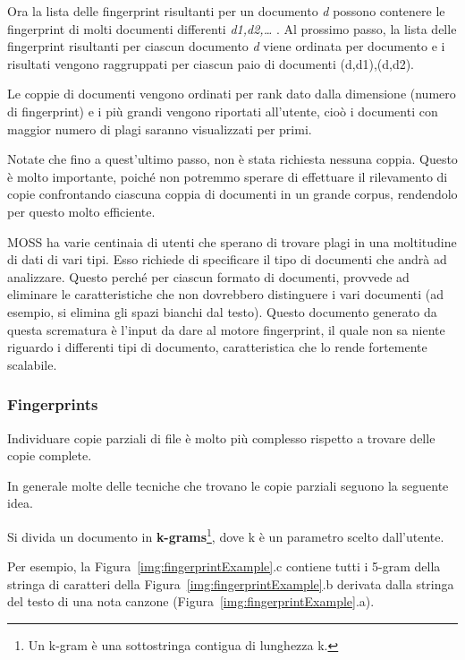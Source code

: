 			Ora la lista delle fingerprint risultanti per un documento \textit{d} possono contenere le fingerprint di molti documenti differenti \textit{ d1,d2,… }.
			Al prossimo passo, la lista delle fingerprint risultanti per ciascun documento \textit{d} viene ordinata per documento e i risultati vengono raggruppati per ciascun paio di documenti (d,d1),(d,d2). 
			
			Le coppie di documenti vengono ordinati per rank dato dalla dimensione (numero di fingerprint) e i più grandi vengono riportati all'utente, cioò i documenti con maggior numero di plagi saranno visualizzati per primi. 
			
			Notate che fino a quest'ultimo passo, non è stata richiesta nessuna coppia. 
			Questo è molto importante, poiché non potremmo sperare di effettuare il rilevamento di copie confrontando ciascuna coppia di documenti in un grande corpus, rendendolo per questo molto efficiente.
	
			MOSS ha varie centinaia di utenti che sperano di trovare plagi in una moltitudine di dati di vari tipi. Esso richiede di specificare il tipo di documenti che andrà ad analizzare. Questo perché per ciascun formato di documenti, provvede ad eliminare le caratteristiche che non dovrebbero distinguere i vari documenti (ad esempio, si elimina gli spazi bianchi dal testo). 
			Questo documento generato da questa scrematura è l'input da dare al motore fingerprint, il quale non sa niente riguardo i differenti tipi di documento, caratteristica che lo rende fortemente scalabile.
			
			\subsubsection{Fingerprints}\label{def:Fingerprint}
				Individuare copie parziali di file è molto più complesso rispetto a trovare delle copie complete.
				
				In generale molte delle tecniche che trovano le copie parziali seguono la seguente idea. 
				
				Si divida un documento in \textbf{k-grams}\footnote{Un k-gram è una sottostringa contigua di lunghezza k.}, dove k è un parametro scelto dall'utente.
				
				Per esempio, la Figura~\ref{img:fingerprintExample}.c contiene tutti i 5-gram della stringa di caratteri della Figura~\ref{img:fingerprintExample}.b derivata dalla stringa del testo di una nota canzone (Figura~\ref{img:fingerprintExample}.a). 
				
